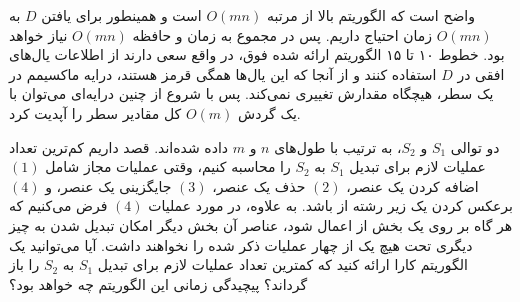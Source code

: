\documentclass{scribe-cgenomics}
\begin{document}
\begin{حل}
واضح است که الگوریتم بالا از مرتبه
$O(mn)$
است و همینطور برای یافتن
$D$
به
$O(mn)$
زمان احتیاج داریم. پس در مجموع به زمان و حافظه
$O(mn)$
نیاز خواهد بود. خطوط ۱۰ تا ۱۵ الگوریتم ارائه شده فوق، در واقع سعی دارند از اطلاعات یال‌های افقی در
$D$
استفاده کنند و از آنجا که این یال‌ها همگی قرمز هستند، درایه ماکسیمم در یک سطر، هیچگاه مقدارش تغییری نمی‌کند. پس با شروع از چنین درایه‌ای می‌توان با یک گردش
$O(m)$
کل مقادیر سطر را آپدیت کرد.
\end{حل}



\bigbreak
\begin{prob}
دو توالی
$S_1$
و
$S_2$،
به ترتیب با طول‌های
$n$
و
$m$
داده شده‌اند. قصد داریم کم‌ترین تعداد عملیات لازم برای تبدیل
$S_1$
به
$S_2$
را محاسبه کنیم، وقتی عملیات مجاز شامل
$(1)$
اضافه کردن یک عنصر،
$(2)$
حذف یک عنصر،
$(3)$
جایگزینی یک عنصر، و
$(4)$
برعکس کردن یک زیر رشته از
باشد. به علاوه، در مورد عملیات
$(4)$
فرض می‌کنیم که هر گاه بر روی یک بخش از
اعمال شود، عناصر آن بخش دیگر امکان تبدیل شدن به چیز دیگری تحت هیچ یک از چهار عملیات ذکر شده را نخواهند داشت. آیا می‌توانید یک الگوریتم کارا ارائه کنید که کمترین تعداد عملیات لازم برای تبدیل
$S_1$
به
$S_2$
را باز گرداند؟ پیچیدگی زمانی این الگوریتم چه خواهد بود؟
\end{prob}
\end{document}
